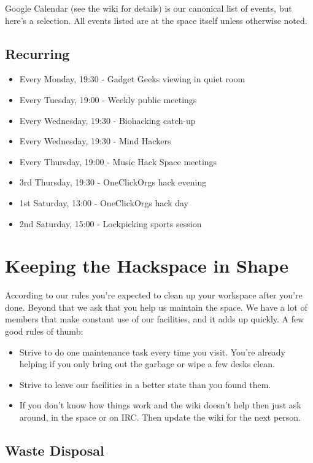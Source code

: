 \documentclass[12pt,a4paper]{book}
\begin{document}
Google Calendar (see the wiki for details) is our canonical list of events, but here's a selection. All events listed are at the space itself unless otherwise noted.

\subsection{Recurring}

\begin{itemize}
	\item Every Monday, 19:30 - Gadget Geeks viewing in quiet room
	\item Every Tuesday, 19:00 - Weekly public meetings
	\item Every Wednesday, 19:30 - Biohacking catch-up
	\item Every Wednesday, 19:30 - Mind Hackers
	\item Every Thursday, 19:00 - Music Hack Space meetings
	\item 3rd Thursday, 19:30 - OneClickOrgs hack evening
	\item 1st Saturday, 13:00 - OneClickOrgs hack day
	\item 2nd Saturday, 15:00 - Lockpicking sports session
\end{itemize}



\section{Keeping the Hackspace in Shape}

According to our rules you're expected to clean up your workspace after you're done. Beyond that we ask that you help us maintain the space. We have a lot of members that make constant use of our facilities, and it adds up quickly. A few good rules of thumb:

\begin{itemize}
	\item Strive to do one maintenance task every time you visit. You're already helping if you only bring out the garbage or wipe a few desks clean.
	\item Strive to leave our facilities in a better state than you found them.
	\item If you don't know how things work and the wiki doesn't help then just ask around, in the space or on IRC. Then update the wiki for the next person.
\end{itemize}

\subsection{Waste Disposal}
\end{document}
